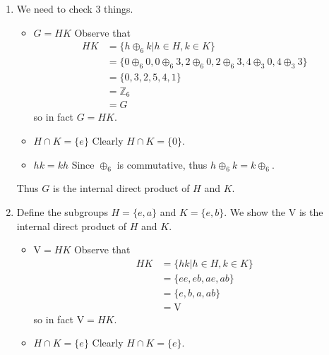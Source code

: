 \begin{enumerate}
    \item We need to check 3 things.
    \begin{itemize}
        \item $\boxed{G = HK}$ Observe that
        \begin{align*}
            HK &= \{h \oplus_6 k \vert h \in H, k \in K\}\\
            &= \{0 \oplus_6 0, 0 \oplus_6 3, 2 \oplus_6 0, 2 \oplus_6 3, 4 \oplus_3 0, 4 \oplus_3 3\}\\
            &= \{0, 3, 2, 5, 4, 1\}\\
            &= \mathbb{Z}_6\\
            &= G
        \end{align*}
        so in fact $G = HK$.

        \item $\boxed{H \cap K = \{e\}}$ Clearly $H \cap K = \{0\}$.

        \item $\boxed{hk = kh}$ Since $\oplus_6$ is commutative, thus $h \oplus_6 k = k \oplus_6$.
    \end{itemize}
    Thus $G$ is the internal direct product of $H$ and $K$.

    \item Define the subgroups $H = \{e, a\}$ and $K = \{e, b\}$. We show the $\mathrm{V}$ is the internal direct product of $H$ and $K$.
    \begin{itemize}
        \item $\boxed{\mathrm{V} = HK}$ Observe that
        \begin{align*}
            HK &= \{hk \vert h \in H, k \in K\}\\
            &= \{ee, eb, ae, ab\}\\
            &= \{e, b, a, ab\}\\
            &= \mathrm{V}
        \end{align*}
        so in fact $\mathrm{V} = HK$.

        \item $\boxed{H \cap K = \{e\}}$ Clearly $H \cap K = \{e\}$.


\end{itemize}
\end{enumerate}
